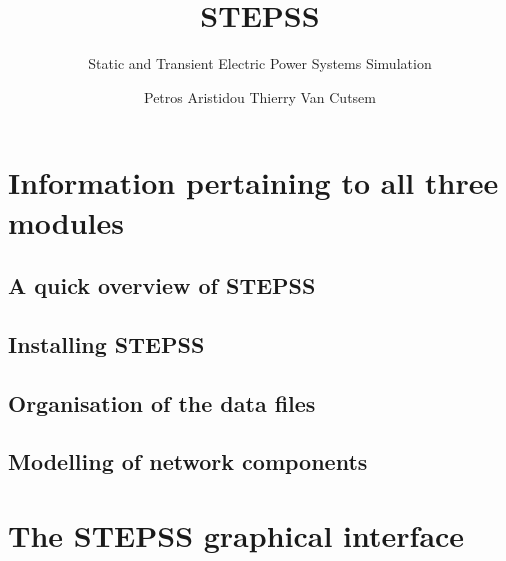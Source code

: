 \documentclass{sps-report}
\begin{document}
\frontmatter

\title{STEPSS}
\subtitle{Static and Transient Electric Power Systems Simulation}
\author{Petros Aristidou \quad Thierry Van Cutsem}

\makecover
\maketitlepage


\label{ch-legal}

\setcounter{tocdepth}{1}
\tableofcontents

\mainmatter

\part{Information pertaining to all three modules}

\chapter{A quick overview of STEPSS}\label{ch-overview}


\chapter{Installing STEPSS}\label{ch-install}




\chapter{Organisation of the data files}\label{ch-files}


\chapter{Modelling of network components}\label{ch-network}


\part{The STEPSS graphical interface}
\end{document}
